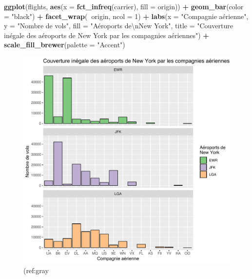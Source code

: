\documentclass[a4paperpaper,]{article}
\newenvironment{Shaded}{\begin{snugshade}}{\end{snugshade}}
\newcommand{\KeywordTok}[1]{\textcolor[rgb]{0.13,0.29,0.53}{\textbf{#1}}}
\newcommand{\DataTypeTok}[1]{\textcolor[rgb]{0.13,0.29,0.53}{#1}}
\newcommand{\DecValTok}[1]{\textcolor[rgb]{0.00,0.00,0.81}{#1}}
\newcommand{\CharTok}[1]{\textcolor[rgb]{0.31,0.60,0.02}{#1}}
\newcommand{\StringTok}[1]{\textcolor[rgb]{0.31,0.60,0.02}{#1}}
\newcommand{\OperatorTok}[1]{\textcolor[rgb]{0.81,0.36,0.00}{\textbf{#1}}}
\newcommand{\NormalTok}[1]{#1}
\theoremstyle{definition}
\theoremstyle{definition}
\theoremstyle{definition}
\theoremstyle{remark}
\begin{document}
\begin{Shaded}
\begin{Highlighting}[]
\KeywordTok{ggplot}\NormalTok{(flights, }\KeywordTok{aes}\NormalTok{(}\DataTypeTok{x =} \KeywordTok{fct_infreq}\NormalTok{(carrier), }\DataTypeTok{fill =}\NormalTok{ origin)) }\OperatorTok{+}
\StringTok{  }\KeywordTok{geom_bar}\NormalTok{(}\DataTypeTok{color =} \StringTok{"black"}\NormalTok{) }\OperatorTok{+}
\StringTok{  }\KeywordTok{facet_wrap}\NormalTok{(}\OperatorTok{~}\NormalTok{origin, }\DataTypeTok{ncol =} \DecValTok{1}\NormalTok{) }\OperatorTok{+}
\StringTok{  }\KeywordTok{labs}\NormalTok{(}\DataTypeTok{x =} \StringTok{"Compagnie aérienne"}\NormalTok{,}
       \DataTypeTok{y =} \StringTok{"Nombre de vols"}\NormalTok{,}
       \DataTypeTok{fill =} \StringTok{"Aéroports de}\CharTok{\textbackslash{}n}\StringTok{New York"}\NormalTok{,}
       \DataTypeTok{title =} \StringTok{"Couverture inégale des aéroports de New York par les compagnies aériennes"}\NormalTok{) }\OperatorTok{+}
\StringTok{  }\KeywordTok{scale_fill_brewer}\NormalTok{(}\DataTypeTok{palette =} \StringTok{"Accent"}\NormalTok{)}
\end{Highlighting}
\end{Shaded}

\begin{figure}[htpb]

{\centering \includegraphics[width=0.9\linewidth]{figure/theme1-1} 

}

\caption{(ref:gray}\label{fig:theme1}
\end{figure}
\end{document}

